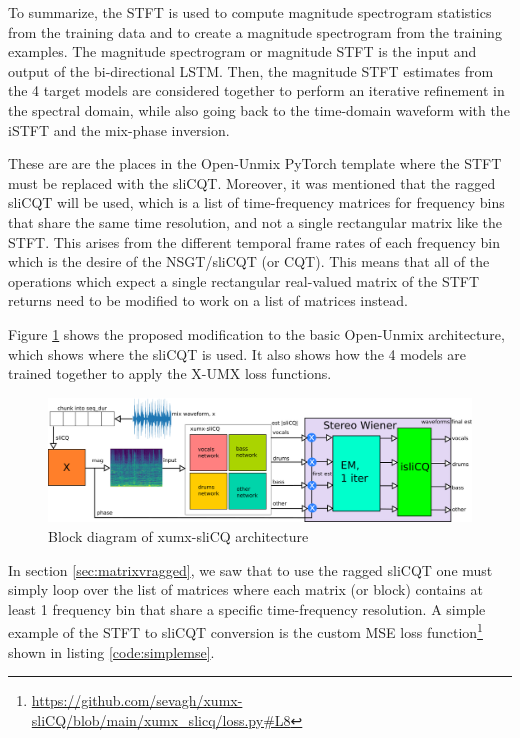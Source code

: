 \documentclass[report.tex]{subfiles}
\begin{document}
To summarize, the STFT is used to compute magnitude spectrogram statistics from the training data and to create a magnitude spectrogram from the training examples. The magnitude spectrogram or magnitude STFT is the input and output of the bi-directional LSTM. Then, the magnitude STFT estimates from the 4 target models are considered together to perform an iterative refinement in the spectral domain, while also going back to the time-domain waveform with the iSTFT and the mix-phase inversion.

These are are the places in the Open-Unmix PyTorch template where the STFT must be replaced with the sliCQT. Moreover, it was mentioned that the ragged sliCQT will be used, which is a list of time-frequency matrices for frequency bins that share the same time resolution, and not a single rectangular matrix like the STFT. This arises from the different temporal frame rates of each frequency bin which is the desire of the NSGT/sliCQT (or CQT). This means that all of the operations which expect a single rectangular real-valued matrix of the STFT returns need to be modified to work on a list of matrices instead.

Figure \ref{fig:xumxslicq} shows the proposed modification to the basic Open-Unmix architecture, which shows where the sliCQT is used. It also shows how the 4 models are trained together to apply the X-UMX loss functions.

\begin{figure}[ht]
	\centering
	\includegraphics[width=\textwidth]{./images-blockdiagrams/xumx_slicq_system_compressed.png}
	\caption{Block diagram of xumx-sliCQ architecture}
	\label{fig:xumxslicq}
\end{figure}

In section \ref{sec:matrixvragged}, we saw that to use the ragged sliCQT one must simply loop over the list of matrices where each matrix (or block) contains at least 1 frequency bin that share a specific time-frequency resolution. A simple example of the STFT to sliCQT conversion is the custom MSE loss function\footnote{\url{https://github.com/sevagh/xumx-sliCQ/blob/main/xumx_slicq/loss.py\#L8}} shown in listing \ref{code:simplemse}.
\end{document}
